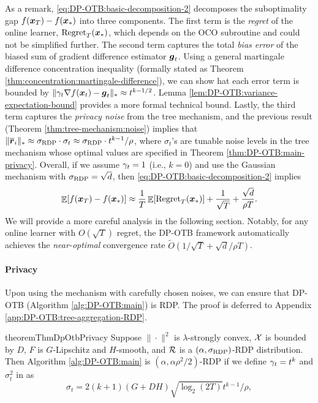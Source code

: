 As a remark, \eqref{eq:DP-OTB:basic-decomposition-2} decomposes the suboptimality gap $f({\boldsymbol{x}}_T)-f({\boldsymbol{x}}_\ast)$ into three components. The first term is the \emph{regret} of the online learner, $\mathrm{Regret}_T({\boldsymbol{x}}_\ast)$, which depends on the OCO subroutine and could not be simplified further. The second term captures the total \emph{bias error} of the biased sum of gradient difference estimator ${\boldsymbol{g}}_t$. Using a general martingale difference concentration inequality (formally stated as Theorem \ref{thm:concentration:martingale-difference}), we can show hat each error term is bounded by $\|\gamma_t\nabla f({\boldsymbol{x}}_t)-{\boldsymbol{g}}_t\|_*\approx t^{k-1/2}$. Lemma \ref{lem:DP-OTB:variance-expectation-bound} provides a more formal technical bound. Lastly, the third term captures the \emph{privacy noise} from the tree mechanism, and the previous result (Theorem \ref{thm:tree-mechanism:noise}) implies that $\|\overline{{\boldsymbol{r}}}_i\|_\ast \approx \sigma_{\mathrm{RDP}} \cdot \sigma_t \approx \sigma_{\mathrm{RDP}} \cdot t^{k-1}/\rho$, where $\sigma_t$'s are tunable noise levels in the tree mechanism whose optimal values are specified in Theorem \ref{thm:DP-OTB:main-privacy}. Overall, if we assume $\gamma_t=1$ (i.e., $k=0$) and use the Gaussian mechanism with $\sigma_{\mathrm{RDP}}=\sqrt{d}$, then \eqref{eq:DP-OTB:basic-decomposition-2} implies
\begin{equation}
\mathop{\mathbb{E}}[f({\boldsymbol{x}}_T) - f({\boldsymbol{x}}_\ast)] \approx \frac{1}{T}\mathop{\mathbb{E}}[\mathrm{Regret}_T({\boldsymbol{x}}_\ast)] + \frac{1}{\sqrt{T}} + \frac{\sqrt{d}}{\rho T}.
\label{eq:DP-OTB:main:approx-bound}
\end{equation}
We will provide a more careful analysis in the following section. Notably, for any online learner with $O(\sqrt{T})$ regret, the DP-OTB framework automatically achieves the \emph{near-optimal} convergence rate $\tilde O(1/\sqrt{T} + \sqrt{d} / \rho T)$.


\paragraph{Privacy}

Upon using the {\tree} mechanism with carefully chosen noises, we can ensure that DP-OTB (Algorithm \ref{alg:DP-OTB:main}) is RDP. The proof is deferred to Appendix \ref{app:DP-OTB:tree-aggregation-RDP}.

\begin{restatable}{theorem}{ThmDpOtbPrivacy}
\label{thm:DP-OTB:main-privacy}
Suppose $\|\cdot\|^2$ is $\lambda$-strongly convex, ${\cal X}$ is bounded by $D$, $F$ is $G$-Lipschitz and $H$-smooth, and ${\cal R}$ is a $(\alpha,\sigma_{\mathrm{RDP}})$-RDP distribution. 
Then Algorithm \ref{alg:DP-OTB:main} is $(\alpha,\alpha\rho^2/2)$-RDP if we define $\gamma_t=t^k$ and $\sigma_t^2$ in {\tree} as 
\begin{equation}
    \sigma_t = 2(k+1)(G+DH)\sqrt{\log_2(2T)}t^{k-1} / \rho, 
    \label{eq:DP-OTB:RDP-noise}
\end{equation}
\end{restatable}

